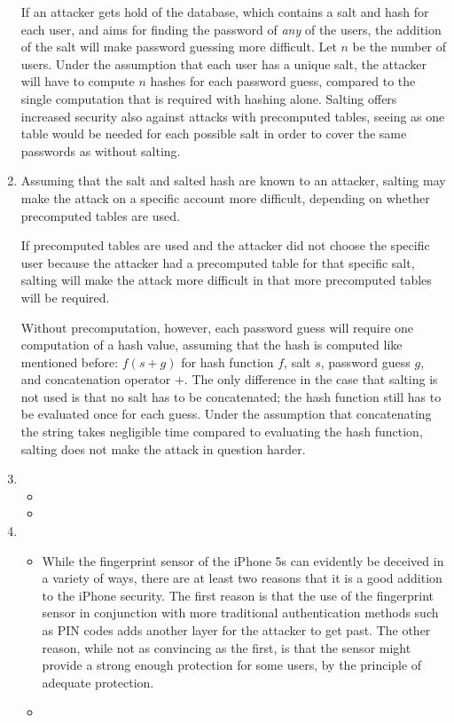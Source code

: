 \begin{enumerate}
If an attacker gets hold of the database, which contains a salt and hash for each user, and aims for finding the password of \emph{any} of the users, the addition of the salt will make password guessing more difficult. Let $n$ be the number of users. Under the assumption that each user has a unique salt, the attacker will have to compute $n$ hashes for each password guess, compared to the single computation that is required with hashing alone. Salting offers increased security also against attacks with precomputed tables, seeing as one table would be needed for each possible salt in order to cover the same passwords as without salting.
\item %
Assuming that the salt and salted hash are known to an attacker, salting may make the attack on a specific account more difficult, depending on whether precomputed tables are used.

If precomputed tables are used and the attacker did not choose the specific user because the attacker had a precomputed table for that specific salt, salting will make the attack more difficult in that more precomputed tables will be required.

Without precomputation, however, each password guess will require one computation of a hash value, assuming that the hash is computed like mentioned before: $f(s + g)$ for hash function $f$, salt $s$, password guess $g$, and concatenation operator $+$. The only difference in the case that salting is not used is that no salt has to be concatenated; the hash function still has to be evaluated once for each guess. Under the assumption that concatenating the string takes negligible time compared to evaluating the hash function, salting does not make the attack in question harder.
\item \highergradesonly
  \begin{itemize}
    \item
    \item
  \end{itemize}
\item %
  \begin{itemize}
    \item
      While the fingerprint sensor of the iPhone 5s can evidently be deceived in a variety of ways, there are at least two reasons that it is a good addition to the iPhone security. The first reason is that the use of the fingerprint sensor in conjunction with more traditional authentication methods such as PIN codes adds another layer for the attacker to get past. The other reason, while not as convincing as the first, is that the sensor might provide a strong enough protection for some users, by the principle of adequate protection.
    \item
  \end{itemize}
\end{enumerate}
